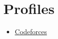 \documentclass[letterpaper,11pt]{article}
\newcommand{\resumeItem}[1]{
  \item\small{
    {#1 \vspace{-2pt}}
  }
}
\newcommand{\resumeItemListStart}{\begin{itemize}}
\newcommand{\resumeItemListEnd}{\end{itemize}\vspace{-5pt}}
\begin{document}

\section{Profiles}
  \vspace{2pt}
  \resumeItemListStart
  \resumeItem{\underline{\href{https://codeforces.com/profile/chaseshobhit}{Codeforces}}}
  \resumeItemListEnd

\end{document}
